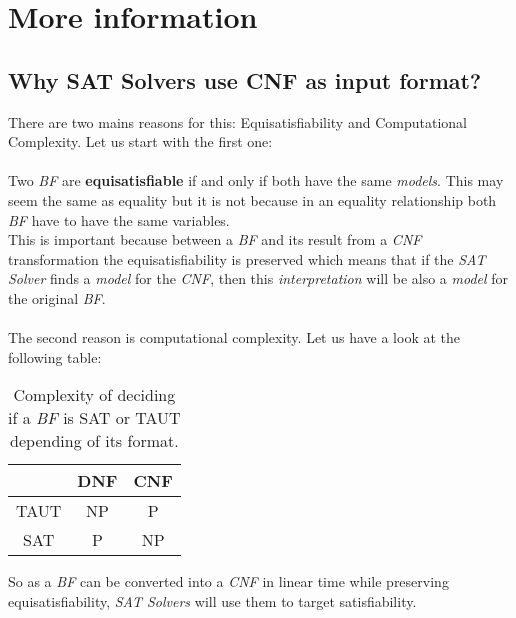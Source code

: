 
\chapter{More information} %

\label{AppendixA} %

\section{Why SAT Solvers use CNF as input format?}
\label{A.1}

There are two mains reasons for this: Equisatisfiability and Computational Complexity. Let us start with the first one: \\\\
Two \emph{BF} are \textbf{equisatisfiable} if and only if both have the same \emph{models}. This may seem the same as equality but it is not because in an equality relationship both \emph{BF} have to have the same variables. \\
This is important because between a \emph{BF} and its result from a \emph{CNF} transformation the equisatisfiability is preserved which means that if the \emph{SAT Solver} finds a \emph{model} for the \emph{CNF}, then this \emph{interpretation} will be also a \emph{model} for the original \emph{BF}.\\\\
The second reason is computational complexity. Let us have a look at the following table:
\begin{table}[h!]
	\centering
	\begin{tabular}{c|c|c|}
		\cline{2-3}
		& DNF & CNF \\ \hline\hline
		\multicolumn{1}{|c||}{TAUT} & NP  & P   \\ \hline
		\multicolumn{1}{|c||}{SAT}  & P   & NP  \\ \hline
	\end{tabular}
	\caption{Complexity of deciding if a \emph{BF} is SAT or TAUT depending of its format.}
	\label{my-label}
\end{table}
So as a \emph{BF} can be converted into a \emph{CNF} in linear time while preserving equisatisfiability, \emph{SAT Solvers} will use them to target satisfiability.
%
